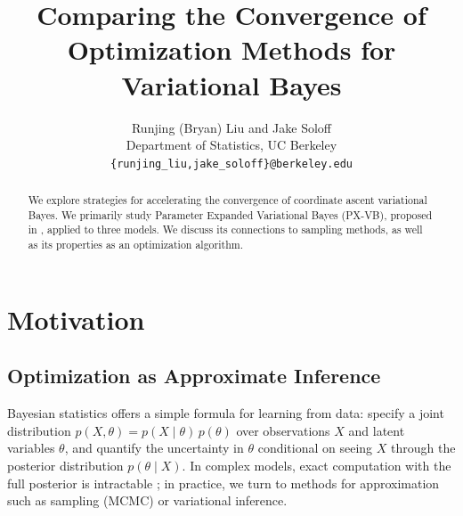 \documentclass{article}
\title{Comparing the Convergence of Optimization Methods for Variational Bayes}
\author{
  Runjing (Bryan) Liu and Jake Soloff \\
  Department of Statistics, UC Berkeley\\
  \texttt{\{runjing\_liu,jake\_soloff\}@berkeley.edu}
}
\begin{document}

\maketitle

\vspace{-1em}

\begin{abstract}
We explore strategies for accelerating the convergence of coordinate ascent variational Bayes. We primarily study Parameter Expanded Variational Bayes (PX-VB), proposed in \cite{Qi}, applied to three models. We discuss its connections to sampling methods, as well as its properties as an optimization algorithm. %
\end{abstract}

\section{Motivation}
\label{motivation}

\subsection{Optimization as Approximate Inference} 

Bayesian statistics offers a simple formula for learning from data: specify a joint distribution $p(X,\theta) = p(X\mid \theta)\,p(\theta)$ over observations $X$ and latent variables $\theta$, and quantify the uncertainty in $\theta$ conditional on seeing $X$ through the posterior distribution $p(\theta\mid X)$. In complex models, exact computation with the full posterior is intractable \cite{Cooper}; in practice, we turn to methods for approximation such as sampling (MCMC) or variational inference.
\end{document}
